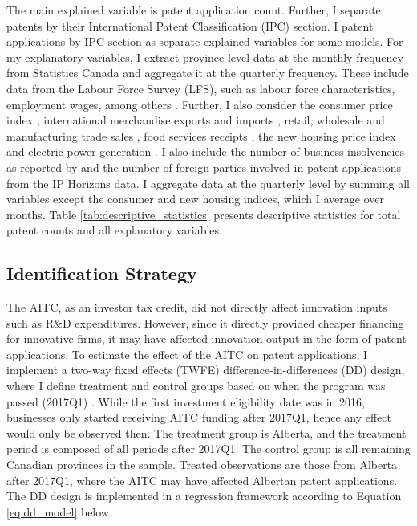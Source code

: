 \documentclass[../main.tex]{subfiles}
\begin{document}
The main explained variable is patent application count. Further, I separate patents by their International Patent Classification (IPC) section. I patent applications by IPC section as separate explained variables for some models. For my explanatory variables, I extract province-level data at the monthly frequency from Statistics Canada and aggregate it at the quarterly frequency. These include data from the Labour Force Survey (LFS), such as labour force characteristics, employment wages, among others \parencite*{lfs_lfc_table,lfs_employee_wages,statisticscanada24,statisticscanada24b}. Further, I also consider the consumer price index \parencite*{cpi}, international merchandise exports and imports \parencite*{statisticscanada24g}, retail, wholesale and manufacturing trade sales \parencite*{retail_trade_sales,wholesale_trade,manufacturing_sales}, food services receipts \parencite*{statisticscanada24c}, the new housing price index \parencite*{statisticscanada24a} and electric power generation \parencite*{statisticscanada24f,statisticscanada08}. I also include the number of business insolvencies as reported by \textcite{insolvency24} and the number of foreign parties involved in patent applications from the IP Horizons data. I aggregate data at the quarterly level by summing all variables except the consumer and new housing indices, which I average over months. Table \ref{tab:descriptive_statistics} presents descriptive statistics for total patent counts and all explanatory variables.

\subsection{Identification Strategy}
The AITC, as an investor tax credit, did not directly affect innovation inputs such as R\&D expenditures. However, since it directly provided cheaper financing for innovative firms, it may have affected innovation output in the form of patent applications. To estimate the effect of the AITC on patent applications, I implement a two-way fixed effects (TWFE) difference-in-differences (DD) design, where I define treatment and control groups based on when the program was passed (2017Q1) \parencite{albertaeconomicdevelopmentandtrade17}. While the first investment eligibility date was in 2016, businesses only started receiving AITC funding after 2017Q1, hence any effect would only be observed then. The treatment group is Alberta, and the treatment period is composed of all periods after 2017Q1. The control group is all remaining Canadian provinces in the sample. Treated observations are those from Alberta after 2017Q1, where the AITC may have affected Albertan patent applications. The DD design is implemented in a regression framework according to Equation \ref{eq:dd_model} below.
\end{document}
